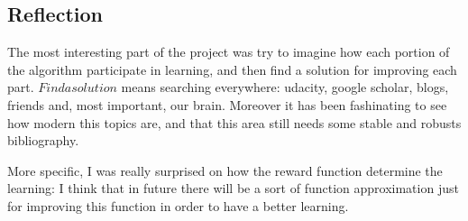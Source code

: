 \documentclass{article}
\begin{document}
\begin{center}
\end{center}

\begin{center}
\end{center}


\subsection{Reflection}
% 
% 
% 
The most interesting part of the project was try to imagine how each portion of the algorithm participate in learning, and then find a solution for improving each part. $Find a solution$ means searching everywhere: udacity, google scholar, blogs, friends and, most important, our brain. Moreover it has been fashinating to see how modern this topics are, and that this area still needs some stable and robusts bibliography.

More specific, I was really surprised on how the reward function determine the learning: I think that in future there will be a sort of function approximation just for improving this function in order to have a better learning.
\end{document}
